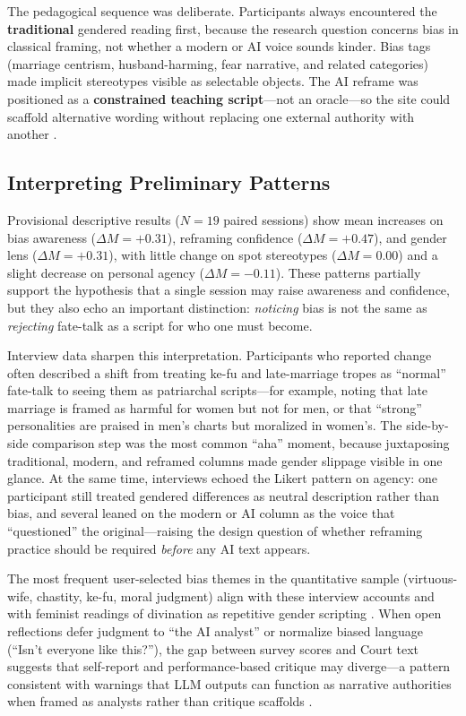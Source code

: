 \documentclass[stu,12pt,floatsintext]{apa7}
\begin{document}
The pedagogical sequence was deliberate. Participants always encountered the \textbf{traditional} gendered reading first, because the research question concerns bias in classical framing, not whether a modern or AI voice sounds kinder. Bias tags (marriage centrism, husband-harming, fear narrative, and related categories) made implicit stereotypes visible as selectable objects. The AI reframe was positioned as a \textbf{constrained teaching script}---not an oracle---so the site could scaffold alternative wording without replacing one external authority with another \parencite{bender2021}.

\subsection{Interpreting Preliminary Patterns}

Provisional descriptive results ($N = 19$ paired sessions) show mean increases on bias awareness ($\Delta M = +0.31$), reframing confidence ($\Delta M = +0.47$), and gender lens ($\Delta M = +0.31$), with little change on spot stereotypes ($\Delta M = 0.00$) and a slight decrease on personal agency ($\Delta M = -0.11$). These patterns partially support the hypothesis that a single session may raise awareness and confidence, but they also echo an important distinction: \emph{noticing} bias is not the same as \emph{rejecting} fate-talk as a script for who one must become.

Interview data sharpen this interpretation. Participants who reported change often described a shift from treating ke-fu and late-marriage tropes as ``normal'' fate-talk to seeing them as patriarchal scripts---for example, noting that late marriage is framed as harmful for women but not for men, or that ``strong'' personalities are praised in men's charts but moralized in women's. The side-by-side comparison step was the most common ``aha'' moment, because juxtaposing traditional, modern, and reframed columns made gender slippage visible in one glance. At the same time, interviews echoed the Likert pattern on agency: one participant still treated gendered differences as neutral description rather than bias, and several leaned on the modern or AI column as the voice that ``questioned'' the original---raising the design question of whether reframing practice should be required \emph{before} any AI text appears.

The most frequent user-selected bias themes in the quantitative sample (virtuous-wife, chastity, ke-fu, moral judgment) align with these interview accounts and with feminist readings of divination as repetitive gender scripting \parencite{butler1990,foucault1972}. When open reflections defer judgment to ``the AI analyst'' or normalize biased language (``Isn't everyone like this?''), the gap between survey scores and Court text suggests that self-report and performance-based critique may diverge---a pattern consistent with warnings that LLM outputs can function as narrative authorities when framed as analysts rather than critique scaffolds \parencite{bender2021,cotter2022}.
\end{document}
